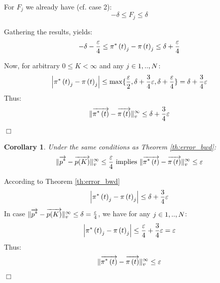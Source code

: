 \documentclass[a4paper,11pt]{article}
\newtheorem{corollary}[theorem]{Corollary}
\newenvironment{proof}{\trivlist \item[\hskip \labelsep{\bf Proof}]}{\hfill\hbox{$\Box$}\endtrivlist}
\begin{document}
\begin{proof}
\begin{enumerate}
					For $F_{j}$ we already have (cf. case 2):
					\begin{equation}
						- \delta \leq F_{j} \leq \delta \nonumber
					\end{equation}
					 
					 Gathering the results, yields:
					 \begin{equation}	
							- \delta - \frac{\varepsilon}{4} \leq \pi^{*} \left( t \right)_{j} - \pi \left( t \right)_{j} \leq \delta + \frac{\varepsilon}{4} \nonumber
					 \end{equation}
			\end{enumerate}
			Now, for arbitrary $ 0 \leq K < \infty$ and any $j \in 1,..,N$:
			\begin{equation}
				\left| \pi^{*} \left( t \right)_{j} - \pi \left( t \right)_{j} \right| \leq \max\{ \frac{\varepsilon}{2}, \delta + \frac{3}{4} \varepsilon, \delta + \frac{\varepsilon}{4} \} = \delta + \frac{3}{4} \varepsilon \nonumber
			\end{equation}
			Thus:
			\begin{equation}
				\lVert   \overrightarrow{\pi^{*} \left( t \right)} - \overrightarrow{\pi \left( t \right) }   \rVert_{v}^{\infty} \leq \delta + \frac{3}{4} \varepsilon \nonumber
			\end{equation}
		\end{proof}
		
		\begin{corollary}
			Under the same conditions as Theorem \ref{th:error_bwd}:
			\begin{equation}
				\lVert  \overrightarrow{p^{*}} - \overrightarrow{p(K)}  \rVert_{v}^{\infty} \leq \frac{\varepsilon}{4} \text{ implies } \lVert  \overrightarrow{\pi^{*} \left( t \right)} - \overrightarrow{\pi \left( t \right) }  \rVert_{v}^{\infty}\leq \varepsilon
			\end{equation}
		\end{corollary}
		\begin{proof}
			According to Theorem \ref{th:error_bwd} 
			\begin{equation}
				\left| \pi^{*} \left( t \right)_{j} - \pi \left( t \right)_{j} \right| \leq \delta + \frac{3}{4} \varepsilon \nonumber
			\end{equation}
			In case $\lVert  \overrightarrow{p^{*}} - \overrightarrow{p(K)}  \rVert_{v}^{\infty} \leq \delta = \frac{\varepsilon}{4}$, we have for any $j \in 1,..,N$:
			\begin{equation}
				\left| \pi^{*} \left( t \right)_{j} - \pi \left( t \right)_{j} \right| \leq \frac{\varepsilon}{4}  + \frac{3}{4} \varepsilon = \varepsilon \nonumber
			\end{equation}
			Thus:
			\begin{equation}
				\lVert  \overrightarrow{\pi^{*} \left( t \right)} - \overrightarrow{\pi \left( t \right) }  \rVert_{v}^{\infty} \leq \varepsilon \nonumber
			\end{equation}
		\end{proof}
		
\end{document}
